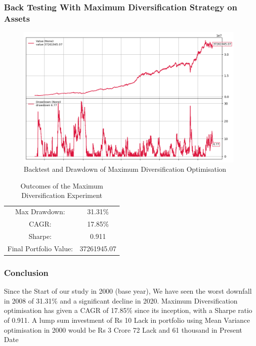 \subsubsection{Back Testing With Maximum Diversification Strategy on Assets}

\begin{figure}[H]
\centering
   \includegraphics[width=1.0\textwidth]{MD/backtest.png}
      \caption{Backtest and Drawdown of Maximum Diversification Optimisation
}
       \label{MD_assets}
\end{figure}

\begin{table}[H]
\centering
\begin{tabular}{|c | c|} 
 \hline
 Max Drawdown: &31.31\%\\
CAGR: &17.85\%\\
Sharpe: &0.911\\
Final Portfolio Value: &37261945.07\\
 \hline
\end{tabular}
\caption{Outcomes of the Maximum Diversification Experiment}
\label{MD outcome table}
\end{table}
\subsubsection{Conclusion}
Since the Start of our study in 2000 (base year), We have seen the worst downfall in 2008 of 31.31\% and a significant decline in 2020. Maximum Diversification optimisation has given a CAGR of 17.85\% since its inception, with a Sharpe ratio of 0.911. A lump sum investment of Rs 10 Lack in portfolio using Mean Variance optimisation in 2000 would be Rs 3 Crore 72 Lack and 61 thousand in Present Date

